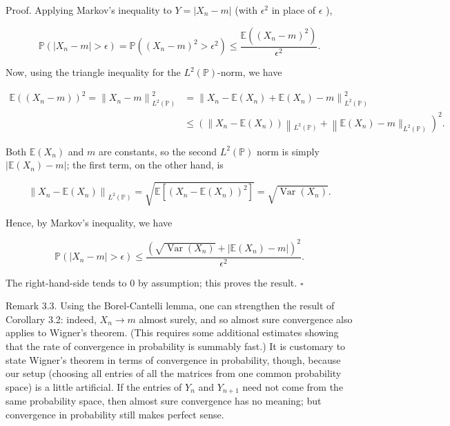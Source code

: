 \documentclass[10pt]{article}
\begin{document}
Proof. Applying Markov's inequality to $Y=\left|X_{n}-m\right|$ (with $\epsilon^{2}$ in place of $\epsilon$ ),

$$
\mathbb{P}\left(\left|X_{n}-m\right|>\epsilon\right)=\mathbb{P}\left(\left(X_{n}-m\right)^{2}>\epsilon^{2}\right) \leq \frac{\mathbb{E}\left(\left(X_{n}-m\right)^{2}\right)}{\epsilon^{2}} .
$$

Now, using the triangle inequality for the $L^{2}(\mathbb{P})$-norm, we have

$$
\begin{aligned}
\mathbb{E}\left(\left(X_{n}-m\right)\right)^{2}=\left\|X_{n}-m\right\|_{L^{2}(\mathbb{P})}^{2} & =\left\|X_{n}-\mathbb{E}\left(X_{n}\right)+\mathbb{E}\left(X_{n}\right)-m\right\|_{L^{2}(\mathbb{P})}^{2} \\
& \left.\leq\left(\| X_{n}-\mathbb{E}\left(X_{n}\right)\right)\left\|_{L^{2}(\mathbb{P})}+\right\| \mathbb{E}\left(X_{n}\right)-m \|_{L^{2}(\mathbb{P})}\right)^{2} .
\end{aligned}
$$

Both $\mathbb{E}\left(X_{n}\right)$ and $m$ are constants, so the second $L^{2}(\mathbb{P})$ norm is simply $\left|\mathbb{E}\left(X_{n}\right)-m\right|$; the first term, on the other hand, is

$$
\left\|X_{n}-\mathbb{E}\left(X_{n}\right)\right\|_{L^{2}(\mathbb{P})}=\sqrt{\mathbb{E}\left[\left(X_{n}-\mathbb{E}\left(X_{n}\right)\right)^{2}\right]}=\sqrt{\operatorname{Var}\left(X_{n}\right)} .
$$

Hence, by Markov's inequality, we have

$$
\mathbb{P}\left(\left|X_{n}-m\right|>\epsilon\right) \leq \frac{\left(\sqrt{\operatorname{Var}\left(X_{n}\right)}+\left|\mathbb{E}\left(X_{n}\right)-m\right|\right)^{2}}{\epsilon^{2}} .
$$

The right-hand-side tends to 0 by assumption; this proves the result. \(\square\)

Remark 3.3. Using the Borel-Cantelli lemma, one can strengthen the result of Corollary 3.2: indeed, $X_{n} \rightarrow m$ almost surely, and so almost sure convergence also applies to Wigner's theorem. (This requires some additional estimates showing that the rate of convergence in probability is summably fast.) It is customary to state Wigner's theorem in terms of convergence in probability, though, because our setup (choosing all entries of all the matrices from one common probability space) is a little artificial. If the entries of $Y_{n}$ and $Y_{n+1}$ need not come from the same probability space, then almost sure convergence has no meaning; but convergence in probability still makes perfect sense.
\end{document}
